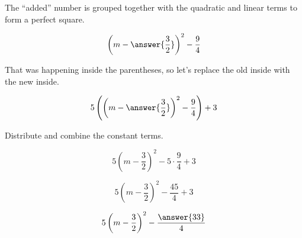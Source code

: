 \documentclass{ximera}
\begin{document}
\begin{exercise}
\begin{procedure}
The ``added'' number is grouped together with the quadratic and linear terms to form a perfect square.



\[ \left( m - \answer{\frac{3}{2}} \right)^2  - \frac{9}{4} \]





\end{procedure}


That was happening inside the parentheses, so let's replace the old inside with the new inside.


\[ 5 \left(  \left( m - \answer{\frac{3}{2}} \right)^2  - \frac{9}{4} \right) + 3 \]




Distribute and combine the constant terms.



\[ 5 \left( m - \frac{3}{2} \right)^2  - 5 \cdot \frac{9}{4}  + 3 \]



\[ 5 \left( m - \frac{3}{2} \right)^2  -   \frac{45}{4}  + 3 \]


\[ 5 \left( m - \frac{3}{2} \right)^2  -   \frac{\answer{33}}{4}  \]










\end{exercise}
\end{document}

